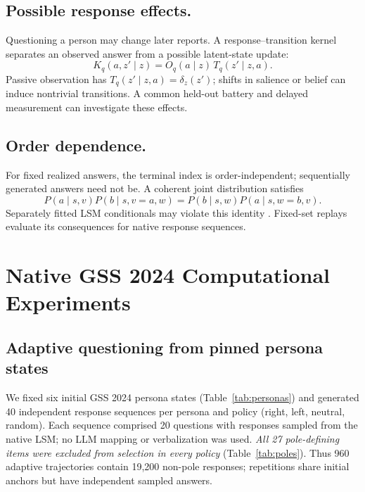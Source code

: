 \documentclass[technote,10pt]{IEEEtran}
\begin{document}
\subsection{Possible response effects.}
Questioning a person may change later reports. A response--transition kernel separates an observed answer from a possible latent-state update:
\begin{equation}
K_q(a,z'\mid z)=O_q(a\mid z)\,T_q(z'\mid z,a).
\label{eq:kernel}
\end{equation}
Passive observation has $T_q(z'\mid z,a)=\delta_z(z')$; shifts in salience or belief can induce nontrivial transitions. A common held-out battery and delayed measurement can investigate these effects.

\subsection{Order dependence.}
For fixed realized answers, the terminal index is order-independent; sequentially generated answers need not be. A coherent joint distribution satisfies
\begin{equation}
P(a\mid s,v)P(b\mid s,v=a,w)
=P(b\mid s,w)P(a\mid s,w=b,v).
\label{eq:compat}
\end{equation}
Separately fitted LSM conditionals may violate this identity \cite{heckerman2000}. Fixed-set replays evaluate its consequences for native response sequences.

\section{Native GSS 2024 Computational Experiments}
\label{sec:native}

\subsection{Adaptive questioning from pinned persona states}
We fixed six initial GSS 2024 persona states (Table~\ref{tab:personas}) and generated 40 independent response sequences per persona and policy (right, left, neutral, random). Each sequence comprised 20 questions with responses sampled from the native LSM; no LLM mapping or verbalization was used. \emph{All 27 pole-defining items were excluded from selection in every policy} (Table~\ref{tab:poles}). Thus 960 adaptive trajectories contain 19,200 non-pole responses; repetitions share initial anchors but have independent sampled answers.
\end{document}
